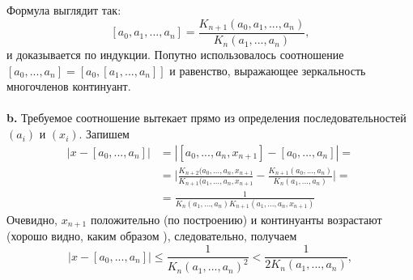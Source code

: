 \documentclass{mai_book}
\begin{document}
\noindent Формула выглядит так:
$$[a_0,a_1,...,a_n]=\frac{K_{n+1}(a_0,a_1,...,a_n)}{K_n(a_1,...,a_n)},$$
и доказывается по индукции. Попутно использовалось соотношение\linebreak
$[a_0,...,a_n]=[a_0,[a_1,...,a_n]]$ и равенство, выражающее зеркальность\linebreak
многочленов континуант.\\
\\
\hspace*{15pt}\textbf{b.} Требуемое соотношение вытекает прямо из определения \linebreak
последовательностей $(a_i)$ и $(x_i)$. Запишем
\begin{equation}
	\begin{split}
		|x-[a_0,...,a_n]|&=|[a_0,...,a_n,x_{n+1}]-[a_0,...,a_n]|=\\
		&=\bigg|\frac{ K_{n+2}(a_0,...,a_n,x_{n+1} }{ K_{n+1}(a_1,...,a_n,x_{n+1} }
		-\frac{ K_{n+1}(a_0,...,a_n) }{K_n(a_1,...,a_n)} \bigg|= \\
		&=\frac{1}{ K_n(a_1,...,a_n)K_{n+1}(a_1,...,a_n,x_{n+1}) }
	\end{split}
\end{equation}
Очевидно, $x_{n+1}$ положительно (по построению) и континуанты возра­стают\linebreak
(хорошо видно, каким образом ), следовательно, получаем
\begin{equation}
	\big|x-[a_0,...,a_n]\big|\leqslant \frac{1}{K_n(a_1,...,a_n)^2}<\frac{1}{2K_n(a_1,...,a_n)},
\end{equation}
\end{document}
